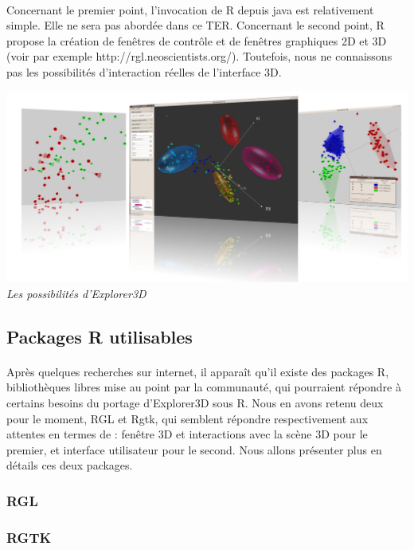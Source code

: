 \paragraph{}
Concernant le premier point, l'invocation de R depuis java est relativement simple. Elle ne sera pas
abordée dans ce TER. Concernant le second point, R propose la création de fenêtres de contrôle et
de fenêtres graphiques 2D et 3D (voir par exemple http://rgl.neoscientists.org/). Toutefois, nous ne
connaissons pas les possibilités d'interaction réelles de l'interface 3D.

\begin{center}
\includegraphics[scale=0.3]{explorer.png}\\
\textit{Les possibilités d'Explorer3D}
\end{center}


\newpage
\subsection{Packages R utilisables}
\paragraph{} Après quelques recherches sur internet, il apparaît qu'il existe des packages R, bibliothèques libres mise au point par la communauté, qui pourraient répondre à certains besoins du portage d'Explorer3D sous R. Nous en avons retenu deux pour le moment, RGL et Rgtk, qui semblent répondre respectivement aux attentes en termes de : fenêtre 3D et interactions avec la scène 3D pour le premier, et interface utilisateur pour le second. Nous allons présenter plus en détails ces deux packages.
\subsubsection{RGL}

\newpage
\subsubsection{RGTK}

\newpage